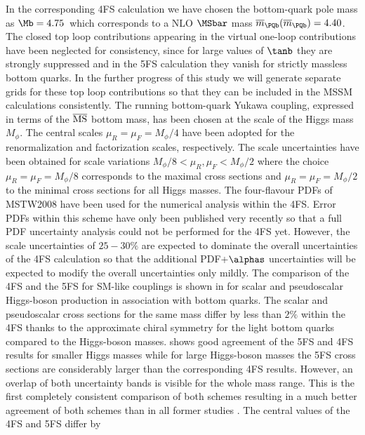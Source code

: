 In the corresponding 4FS calculation we have chosen the bottom-quark
pole mass as $\Mb=4.75$\UGeV~which corresponds to a NLO 
$\MSbar$
mass $\overline{m}_\PQb(\overline{m}_\PQb)=4.40$\UGeV. The closed top loop
contributions appearing in the virtual one-loop contributions have been
neglected for consistency, since for large values of $\tanb$ they
are strongly suppressed and in the 5FS calculation they vanish for
strictly massless bottom quarks. In the further progress of this study
we will generate separate grids for these top loop contributions so that
they can be included in the MSSM calculations consistently. The running
bottom-quark Yukawa coupling, expressed in terms of the $\overline{\rm
MS}$ bottom mass, has been chosen at the scale of the Higgs mass
$M_\phi$. The central scales $\mu_R=\mu_F=M_\phi/4$ have been adopted
for the renormalization and factorization scales, respectively. The
scale uncertainties have been obtained for scale variations
$M_\phi/8 < \mu_R,\mu_F < M_\phi/2$ where the choice $\mu_R=\mu_F =
M_\phi/8$ corresponds to the maximal cross sections and $\mu_R=\mu_F =
M_\phi/2$ to the minimal cross sections for all Higgs masses. The
four-flavour PDFs of MSTW2008 \cite{Martin:2010db} have been used for
the numerical analysis within the 4FS. Error PDFs within this scheme
have only been published very recently so that a full PDF uncertainty
analysis could not be performed for the 4FS yet.  However, the scale
uncertainties of $25{-}30\%$ are expected to dominate the overall
uncertainties of the 4FS calculation so that the additional
PDF+$\alphas$ uncertainties will be expected to modify the overall
uncertainties only mildly. The comparison of the 4FS and the 5FS for
SM-like couplings is shown in  for
scalar and pseudoscalar Higgs-boson production in association with
bottom quarks.  The scalar and pseudoscalar cross sections for the same
mass differ by less than $2\%$ within the 4FS thanks to the approximate
chiral symmetry for the light bottom quarks compared to the Higgs-boson
masses.   shows good agreement of the
5FS and 4FS results for smaller Higgs masses while for large Higgs-boson
masses the 5FS cross sections are considerably larger than the
corresponding 4FS results. However, an overlap of both uncertainty bands
is visible for the whole mass range. This is the first completely
consistent comparison of both schemes resulting in a much better
agreement of both schemes than in all former studies
\cite{Campbell:2004pu}. The central values of the 4FS and 5FS differ by
